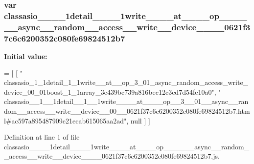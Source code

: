 \subsubsection[{classasio\+\_\+\+\_\+1\+\_\+\+\_\+1detail\+\_\+\+\_\+1\+\_\+\+\_\+1write\+\_\+\+\_\+\+\_\+\+\_\+at\+\_\+\+\_\+\+\_\+\+\_\+op\+\_\+\+\_\+3\+\_\+\+\_\+01\+\_\+\+\_\+async\+\_\+\+\_\+random\+\_\+\+\_\+access\+\_\+\+\_\+write\+\_\+\+\_\+device\+\_\+\+\_\+00\+\_\+\+\_\+0621f37c6c6200352c080fe69824512b7}]{\setlength{\rightskip}{0pt plus 5cm}var classasio\+\_\+\+\_\+\_\+\+\_\+1detail\+\_\+\+\_\+\_\+\+\_\+1write\+\_\+\+\_\+\+\_\+\+\_\+at\+\_\+\+\_\+\+\_\+\+\_\+op\+\_\+\+\_\+\_\+\+\_\+\_\+\+\_\+async\+\_\+\+\_\+random\+\_\+\+\_\+access\+\_\+\+\_\+write\+\_\+\+\_\+device\+\_\+\+\_\+\_\+\+\_\+0621f37c6c6200352c080fe69824512b7}\label{classasio____1____1detail____1____1write________at________op____3____01____async____random____ac8f799258a17473d56b551601566fda6b_ace703e6b50e75a68f3066a66f3811a7c}
{\bfseries Initial value\+:}
\begin{DoxyCode}
=
[
    [ \textcolor{stringliteral}{"
      classasio\_1\_1detail\_1\_1write\_\_at\_\_op\_3\_01\_async\_random\_access\_write\_device\_00\_01boost\_1\_1array\_3e439bc739a816bec12c3cd7d54fe10a0"}, \textcolor{stringliteral}{"
      classasio\_\_1\_\_1detail\_\_1\_\_1write\_\_\_\_at\_\_\_\_op\_\_3\_\_01\_\_async\_\_random\_\_access\_\_write\_\_device\_\_00\_\_0621f37c6c6200352c080fe69824512b7.html#ac597a895487909c21ecab615065aa2ad"}, null ]
]
\end{DoxyCode}


Definition at line 1 of file classasio\+\_\+\+\_\+\_\+\+\_\+1detail\+\_\+\+\_\+\_\+\+\_\+1write\+\_\+\+\_\+\+\_\+\+\_\+at\+\_\+\+\_\+\+\_\+\+\_\+op\+\_\+\+\_\+\_\+\+\_\+\_\+\+\_\+async\+\_\+\+\_\+random\+\_\+\+\_\+access\+\_\+\+\_\+write\+\_\+\+\_\+device\+\_\+\+\_\+\_\+\+\_\+0621f37c6c6200352c080fe69824512b7.\+js.

